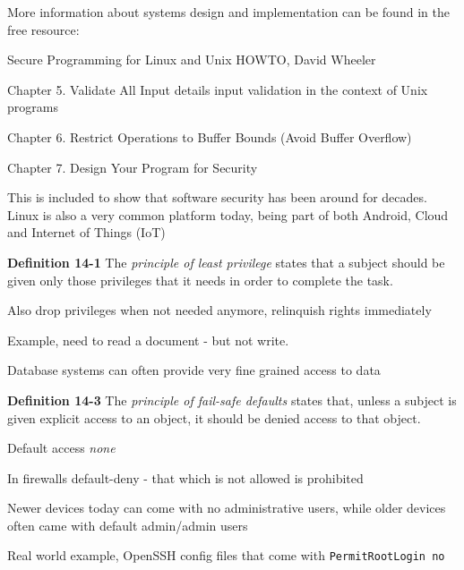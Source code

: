 \documentclass[Screen16to9,17pt]{foils}
\begin{document}

\begin{list1}
\item More information about systems design and implementation can be found in the free resource:
\item Secure Programming for Linux and Unix HOWTO, David Wheeler
\item {}
\item Chapter 5. Validate All Input details input validation in the context of Unix programs
\item Chapter 6. Restrict Operations to Buffer Bounds (Avoid Buffer Overflow)
\item Chapter 7. Design Your Program for Security
\end{list1}

This is included to show that software security has been around for decades. Linux is also a very common platform today, being part of both Android, Cloud and Internet of Things (IoT)


\begin{list1}
\item {\bf Definition 14-1} The \emph{principle of least privilege} states that a subject should be given only those privileges that it needs in order to complete the task.
\item Also drop privileges when not needed anymore, relinquish rights immediately
\item Example, need to read a document - but not write.
\item Database systems can often provide very fine grained access to data
\end{list1}


\begin{list1}
\item {\bf Definition 14-3} The \emph{principle of fail-safe defaults} states that, unless a subject is given explicit access to an object, it should be denied access to that object.
\item Default access \emph{none}
\item In firewalls default-deny - that which is not allowed is prohibited
\item Newer devices today can come with no administrative users, while older devices often came with default admin/admin users
\item Real world example, OpenSSH config files that come with \verb+PermitRootLogin no+
\end{list1}




\slidenext{}
\end{document}
